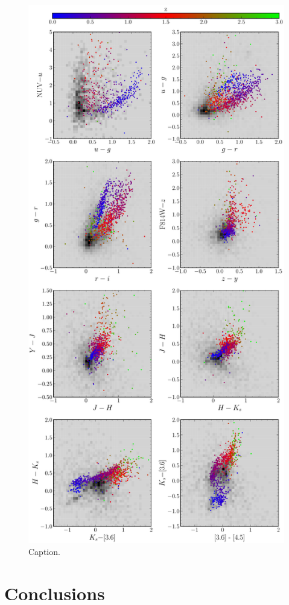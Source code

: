 \begin{figure}
	\centering
	\includegraphics[width=0.85\columnwidth, height=0.95\textheight]{Figures/smg_colours.pdf}
	\caption{{\color{red} Caption.}}
	\label{fig:smg_colours}
\end{figure}

\section{Conclusions}